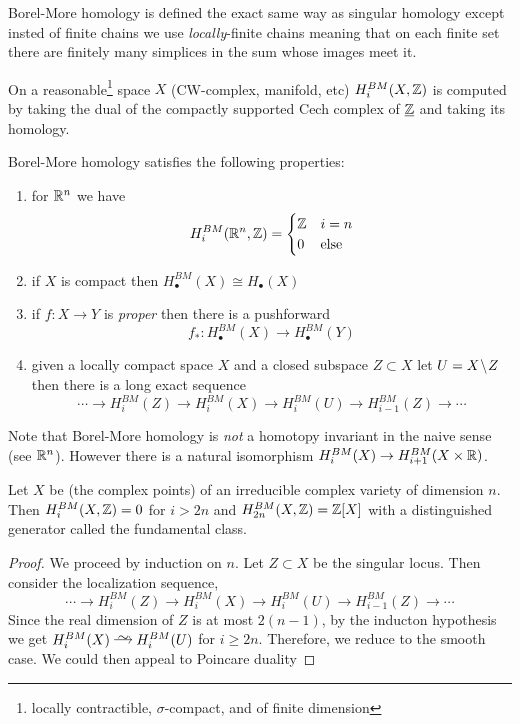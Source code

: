 \documentclass[12pt]{article}
\begin{document}
Borel-More homology is defined the exact same way as singular homology except insted of finite chains we use \textit{locally}-finite chains meaning that on each finite set there are finitely many simplices in the sum whose images meet it. 

On a reasonable\footnote{locally contractible, $\sigma$-compact, and of finite dimension} space $X$ (CW-complex, manifold, etc) $H^{BM}_i(X, \mathbb{Z})$ is computed by taking the dual of the compactly supported Cech complex of $\underline{\mathbb{Z}}$ and taking its homology.

\begin{prop}
Borel-More homology satisfies the following properties:
\begin{enumerate}
\item for $\mathbb{R}^n$ we have
\[ H_i^{BM}(\mathbb{R}^n, \mathbb{Z}) = 
\begin{cases}
\mathbb{Z} & i = n
\\
0 & \text{else}
\end{cases} \]
\item if $X$ is compact then $H_\bullet^{BM}(X) \cong H_\bullet(X)$
\item if $f : X \to Y$ is \textit{proper} then there is a pushforward
\[ f_* : H^{BM}_\bullet(X) \to H^{BM}_\bullet(Y) \]
\item given a locally compact space $X$ and a closed subspace $Z \subset X$ let $U = X \! \setminus \! Z$ then there is a long exact sequence
\[ \cdots \to H_i^{BM}(Z) \to H_i^{BM}(X) \to H_i^{BM}(U) \to H_{i-1}^{BM}(Z) \to \cdots \]
\end{enumerate}
\end{prop} 


\begin{rmk}
Note that Borel-More homology is \textit{not} a homotopy invariant in the naive sense (see $\mathbb{R}^n$). However there is a natural isomorphism $H^{BM}_i(X) \to H^{BM}_{i+1}(X \times \mathbb{R})$.
\end{rmk}

\begin{prop}
Let $X$ be (the complex points) of an irreducible complex variety of dimension $n$. Then $H^{BM}_i(X, \mathbb{Z}) = 0$ for $i > 2n$ and $H^{BM}_{2n}(X, \mathbb{Z}) = \mathbb{Z} [X]$ with a distinguished generator called the fundamental class. 
\end{prop}

\begin{proof}
We proceed by induction on $n$. Let $Z \subset X$ be the singular locus. Then consider the localization sequence,
\[ \cdots \to H_i^{BM}(Z) \to H_i^{BM}(X) \to H_i^{BM}(U) \to H_{i-1}^{BM}(Z) \to \cdots \]
Since the real dimension of $Z$ is at most $2(n-1)$, by the inducton hypothesis we get $H_i^{BM}(X) \iso H_i^{BM}(U)$ for $i \ge 2n$. Therefore, we reduce to the smooth case. We could then appeal to Poincare duality
\end{proof}
\end{document}
